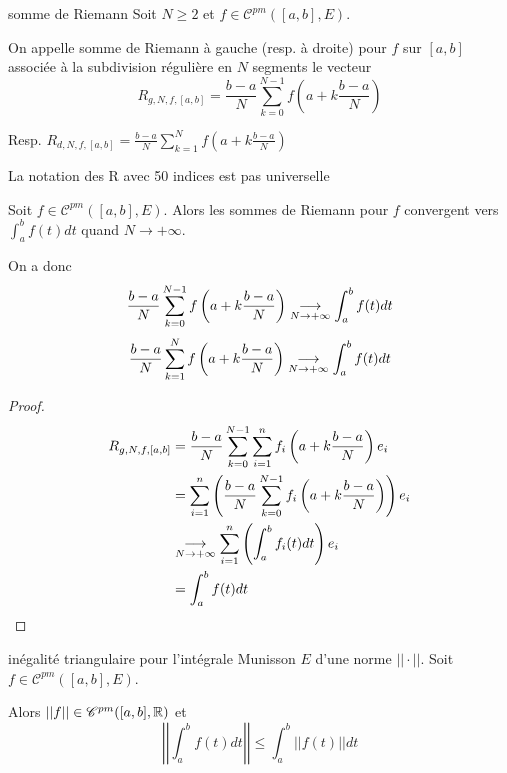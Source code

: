 \begin{definition}{somme de Riemann}{}
    Soit $N \geqslant 2$ et $f \in \mathscr C^{pm}([a, b], E)$.

    On appelle somme de Riemann à gauche (resp. à droite) pour $f$ sur $[a, b]$ associée à la 
    subdivision régulière en $N$ segments le vecteur 
    $$R_{g, N, f, [a, b]} = \frac{b-a} N \sum_{k=0}^{N-1} f\left( a + k \frac{b-a}{N} \right)$$

    Resp. $\displaystyle R_{d, N, f, [a, b]} = \frac{b-a} N \sum_{k=1}^{N} f\left( a + k \frac{b-a}{N} \right)$
\end{definition}

\begin{remarque}
    La notation des R avec 50 indices est pas universelle
\end{remarque}

\begin{proposition}{}{}
    Soit $f \in \mathscr C^{pm}([a, b], E)$. Alors les sommes de Riemann pour $f$ convergent vers 
    $\displaystyle \int_a^b f(t) dt$ quand $N \to +\infty$.

    On a donc 
    $$ \frac{b - a }{N } \sum_{k = 0 }^{N - 1 } f\left( a + k \frac{b - a } N \right) \underset{N \to + \infty}{\longrightarrow} \int_a^b f(t) dt$$
    $$ \frac{b - a }{N } \sum_{k = 1 }^{N} f\left( a + k \frac{b - a } N \right) \underset{N \to + \infty}{\longrightarrow} \int_a^b f(t) dt$$

\end{proposition}


\begin{proof}
    \begin{align*}
        R_{g, N, f, [a, b]} & = \frac{b - a }{N } \sum_{k = 0 }^{N - 1 } \sum_{i = 1 }^{n } f_i\left( a + k \frac{b - a } N \right) e_i \\
        & = \sum_{i = 1 }^{n } \left( \frac{b - a }{N } \sum_{k = 0 }^{N - 1 } f_i\left( a + k \frac{b - a } N \right) \right) e_i \\
        & \underset{N \to + \infty}{\longrightarrow} \sum_{i = 1 }^{n } \left( \int_a^b f_i(t) dt \right) e_i \\
        & = \int_a^b f(t) dt
    \end{align*}
\end{proof}

\begin{theoreme}{inégalité triangulaire pour l'intégrale}{}
    Munisson $E$ d'une norme $||\cdot||$. Soit $f \in \mathscr C^{pm}([a, b], E)$.
    
    Alors $||f|| \in \mathscr C^{pm}([a, b], \mathbb{R})$ et
    $$\left|\left| \int_a^b f(t) dt \right|\right| \leqslant \int_a^b ||f(t)|| dt$$
\end{theoreme}

